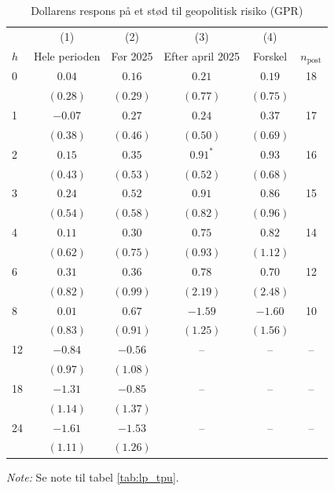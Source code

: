 \begin{table}[H]
\centering
\caption{Dollarens respons på et stød til geopolitisk risiko (GPR)}
\label{tab:lp_gpr}
\begin{threeparttable}
\begin{tabular}{l cccc c}
\toprule
 & (1) & (2) & (3) & (4) & \\
$h$ & Hele perioden & Før 2025 & Efter april 2025 & Forskel & $n_{\text{post}}$ \\
\midrule
0 & $0.04$ & $0.16$ & $0.21$ & $0.19$ & 18 \\
 & $(0.28)$ & $(0.29)$ & $(0.77)$ & $(0.75)$ & \\[2pt]
1 & $-0.07$ & $0.27$ & $0.24$ & $0.37$ & 17 \\
 & $(0.38)$ & $(0.46)$ & $(0.50)$ & $(0.69)$ & \\[2pt]
2 & $0.15$ & $0.35$ & $0.91^{*}$ & $0.93$ & 16 \\
 & $(0.43)$ & $(0.53)$ & $(0.52)$ & $(0.68)$ & \\[2pt]
3 & $0.24$ & $0.52$ & $0.91$ & $0.86$ & 15 \\
 & $(0.54)$ & $(0.58)$ & $(0.82)$ & $(0.96)$ & \\[2pt]
4 & $0.11$ & $0.30$ & $0.75$ & $0.82$ & 14 \\
 & $(0.62)$ & $(0.75)$ & $(0.93)$ & $(1.12)$ & \\[2pt]
6 & $0.31$ & $0.36$ & $0.78$ & $0.70$ & 12 \\
 & $(0.82)$ & $(0.99)$ & $(2.19)$ & $(2.48)$ & \\[2pt]
8 & $0.01$ & $0.67$ & $-1.59$ & $-1.60$ & 10 \\
 & $(0.83)$ & $(0.91)$ & $(1.25)$ & $(1.56)$ & \\[2pt]
12 & $-0.84$ & $-0.56$ & – & – & – \\
 & $(0.97)$ & $(1.08)$ &  &  & \\[2pt]
18 & $-1.31$ & $-0.85$ & – & – & – \\
 & $(1.14)$ & $(1.37)$ &  &  & \\[2pt]
24 & $-1.61$ & $-1.53$ & – & – & – \\
 & $(1.11)$ & $(1.26)$ &  &  & \\[2pt]
\bottomrule
\end{tabular}
\begin{tablenotes}[flushleft]\footnotesize
\item \textit{Note:} Se note til tabel \ref{tab:lp_tpu}.
\end{tablenotes}
\end{threeparttable}
\end{table}